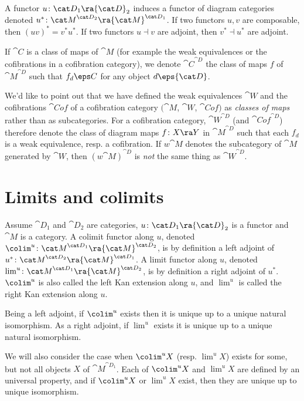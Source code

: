 A functor $u \colon {\cat D}_1 \ra {\cat D}_2$ induces a functor of diagram categories denoted $u^* \colon {\cat M}^{{\cat D}_2} \ra {\cat M}^{{\cat D}_1}$. If two functors $u, v$ are composable, then $(uv)^* = v^*u^*$. If two functors $u \dashv v$ are adjoint, then $v^* \dashv u^*$ are adjoint.

If ${\cat C}$ is a class of maps of ${\cat M}$ (for example the weak equivalences or the cofibrations in a cofibration category), we denote ${\cat C}^{\cat D}$ the class of maps $f$ of ${\cat M}^{\cat D}$ such that $f_d \eps C$ for any object $d \eps {\cat D}$.

We'd like to point out that we have defined the weak equivalences ${\cat W}$ and the cofibrations ${\cat Cof}$ of a cofibration category $({\cat M}$, ${\cat W}$, ${\cat Cof})$ as {\it classes of maps} rather than as subcategories. For a cofibration category, ${\cat W}^{\cat D}$ (and ${\cat Cof}^{\cat D}$) therefore denote the class of diagram maps $f \colon X \ra Y$ in ${\cat M}^{\cat D}$ such that each $f_d$ is a weak equivalence, resp. a cofibration. If $w{\cat M}$ denotes the subcategory of ${\cat M}$ generated by ${\cat W}$, then $(w{\cat M})^{\cat D}$ is {\it not} the same thing as ${\cat W}^{\cat D}$.

\section{Limits and colimits}
\label{sec:relativelimcolim}
Assume ${\cat D}_1$ and ${\cat D}_2$ are categories, $u \colon {\cat D}_1 \ra {\cat D}_2$ is a functor and ${\cat M}$ is a category. A colimit functor along $u$, denoted $\colim^u \colon {\cat M}^{{\cat D}_1} \ra {\cat M}^{{\cat D}_2}$, is by definition a left adjoint of $u^* \colon {\cat M}^{{\cat D}_2} \ra {\cat M}^{{\cat D}_1}$. A limit functor along $u$, denoted $\lim^u \colon {\cat M}^{{\cat D}_1} \ra {\cat M}^{{\cat D}_2}$, is by definition a right adjoint of $u^*$. $\colim^u$ is also called the left Kan extension along $u$, and $\lim^u$ is called the right Kan extension along $u$. 

Being a left adjoint, if $\colim^u$ exists then it is unique up to a unique natural isomorphism. As a right adjoint, if $\lim^u$ exists it is unique up to a unique natural isomorphism. 

We will also consider the case when $\colim^uX$ (resp. $\lim^uX$) exists for some, but not all objects $X$ of ${\cat M}^{{\cat D}_1}$. Each of $\colim^uX$ and $\lim^uX$ are defined by an universal property, and if $\colim^uX$ or $\lim^uX$ exist, then they are unique up to unique isomorphism.

